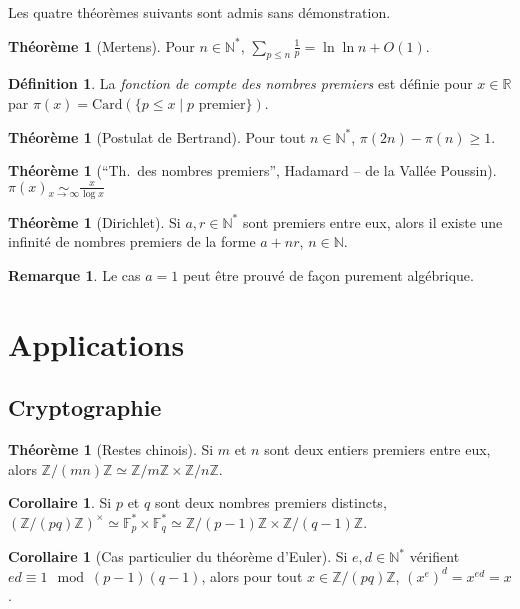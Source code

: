 \documentclass[a5paper, 10pt]{article}
\theoremstyle{definition}
\newtheorem{definition}[equation]{Définition}
\newtheorem{theorem}[equation]{Théorème}
\newtheorem{remark}[equation]{Remarque}
\newtheorem{corollary}[equation]{Corollaire}
\newcounter{n}
\def\F{\mathbb{F}}
\def\Z{\mathbb{Z}}
\def\N{\mathbb{N}}
\def\R{\mathbb{R}}
\begin{document}
Les quatre théorèmes suivants sont admis sans démonstration.

\begin{theorem}[Mertens]
  Pour $n \in \N^*$, $\displaystyle \sum_{p \leq n} \frac{1}{p} = \ln \ln n + O(1)$.
\end{theorem}

\begin{definition}
  La \emph{fonction de compte des nombres premiers} est définie pour
  $x \in \R$ par $\pi(x) = \mathrm{Card}(\{p \leq x \mid \text{\(p\) premier}\})$.
\end{definition}
\begin{theorem}[Postulat de Bertrand]
  Pour tout $n \in \N^*$, $\pi(2n) - \pi(n) \geq 1$.
\end{theorem}
\begin{theorem}[\enquote{Th.\ des nombres premiers}, Hadamard -- de la Vallée Poussin]
  $\displaystyle \pi(x) \underset{x \to \infty}{\sim} \frac{x}{\log x}$
\end{theorem}

\begin{theorem}[Dirichlet]
  Si $a, r \in \N^*$ sont premiers entre eux, alors il existe une
  infinité de nombres premiers de la forme $a+nr$, $n \in \N$.
\end{theorem}
\begin{remark}
  Le cas $a = 1$ peut être prouvé de façon purement algébrique.
\end{remark}

\section{Applications}

\subsection{Cryptographie}

\begin{theorem}[Restes chinois]
  Si $m$ et $n$ sont deux entiers premiers entre eux, alors
  $\Z/(mn)\Z \simeq \Z/m\Z \times \Z/n\Z$.
\end{theorem}
\begin{corollary}
  Si $p$ et $q$ sont deux nombres premiers distincts,
  ${(\Z/(pq)\Z)}^\times \simeq \F_p^* \times \F_q^* \simeq \Z/(p-1)\Z
  \times \Z/(q-1)\Z$.
\end{corollary}
\begin{corollary}[Cas particulier du théorème d'Euler]
  Si $e, d \in \N^*$ vérifient $ed \equiv 1 \mod (p-1)(q-1)$, alors
  pour tout $x \in \Z/(pq)\Z$, $(x^e)^d = x^{ed} = x$.
\end{corollary}
\end{document}
